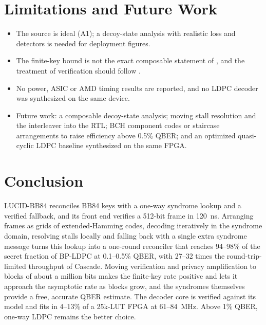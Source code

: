 \documentclass[conference]{IEEEtran}
\begin{document}
\section{Limitations and Future Work}\label{sec:limits}
\begin{itemize}
\item The source is ideal (A1); a decoy-state analysis \cite{lim2014} with realistic loss and detectors is needed for deployment figures.
\item The finite-key bound is not the exact composable statement of \cite{tomamichel2012}, and the treatment of verification should follow \cite{tsurumaru2025}.
\item No power, ASIC or AMD timing results are reported, and no LDPC decoder was synthesized on the same device.
\item Future work: a composable decoy-state analysis; moving stall resolution and the interleaver into the RTL; BCH component codes or staircase arrangements \cite{smith2012} to raise efficiency above 0.5\% QBER; and an optimized quasi-cyclic LDPC baseline synthesized on the same FPGA.
\end{itemize}

\section{Conclusion}\label{sec:conclusion}
LUCID-BB84 reconciles BB84 keys with a one-way syndrome lookup and a verified fallback, and its front end verifies a 512-bit frame in 120~ns. Arranging frames as grids of extended-Hamming codes, decoding iteratively in the syndrome domain, resolving stalls locally and falling back with a single extra syndrome message turns this lookup into a one-round reconciler that reaches 94--98\% of the secret fraction of BP-LDPC at 0.1--0.5\% QBER, with 27--32 times the round-trip-limited throughput of Cascade. Moving verification and privacy amplification to blocks of about a million bits makes the finite-key rate positive and lets it approach the asymptotic rate as blocks grow, and the syndromes themselves provide a free, accurate QBER estimate. The decoder core is verified against its model and fits in 4--13\% of a 25k-LUT FPGA at 61--84~MHz. Above 1\% QBER, one-way LDPC remains the better choice.



\end{document}
